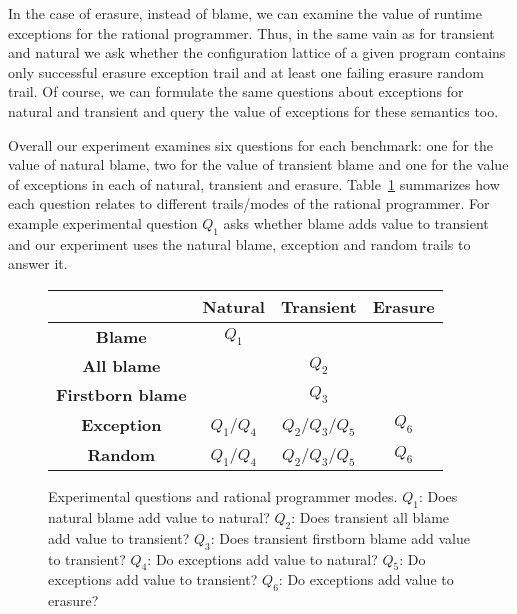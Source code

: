 In the case of erasure, instead of blame, we can examine
the value of runtime exceptions for the rational programmer. Thus, in the
same vain as for transient and natural we
ask whether the configuration lattice of a given program 
contains only successful erasure exception trail and at least one failing
erasure random trail. Of course, we can formulate the same questions about 
 exceptions for natural and transient and query the value of
exceptions for these semantics too.


Overall our experiment examines six questions for each benchmark: one for the value of natural
blame, two for the value of transient blame and one for the value of
exceptions in each of natural, transient and erasure.
Table~\ref{fig:experiment-outline} summarizes how each question relates to different
trails/modes of the rational programmer. For example 
experimental question $Q_1$ asks whether blame adds value to transient and 
our experiment uses the natural blame, exception and random trails to
answer it.

\begin{figure}
\center
{\begin{tabular}[c]{c|c|c|c}
                        & {\bf Natural}        & {\bf Transient}          & {\bf Erasure}  \\
\hline 
{\bf Blame}             &       $Q_1$          &                          &               \\
{\bf All blame}         &                      &     $Q_2$                &               \\
{\bf Firstborn blame}   &                      &     $Q_3$                &               \\
{\bf Exception}         &       $Q_1$/$Q_4$    &     $Q_2$/$Q_3$/$Q_5$    &      $Q_6$    \\
{\bf Random}            &       $Q_1$/$Q_4$    &     $Q_2$/$Q_3$/$Q_5$    &      $Q_6$    \\
\end{tabular}}
  \caption{ Experimental questions and rational programmer modes. $Q_1$:
  Does natural blame add value to natural? $Q_2$: Does transient all blame
  add value to transient?  $Q_3$: Does transient firstborn blame add value
  to transient?  $Q_4$: Do exceptions add value to natural?  $Q_5$: Do
  exceptions add value to transient? $Q_6$: Do exceptions add value to
  erasure? } 
  \label{fig:experiment-outline}
\end{figure}

